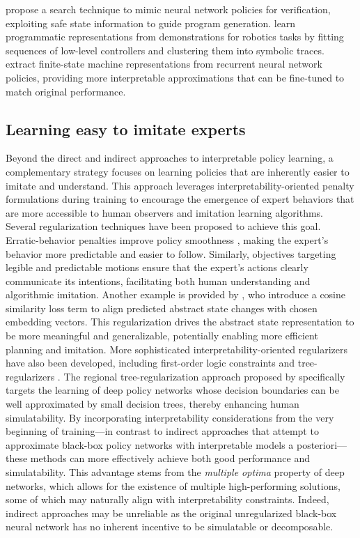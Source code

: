 \cite{zhu_inductive_2019} propose a search technique to mimic neural network policies for verification, exploiting safe state information to guide program generation. \cite{burke_explanation_2019} learn programmatic representations from demonstrations for robotics tasks by fitting sequences of low-level controllers and clustering them into symbolic traces. \cite{Koul_learning_2019} extract finite-state machine representations from recurrent neural network policies, providing more interpretable approximations that can be fine-tuned to match original performance.

\subsection{Learning easy to imitate experts}
Beyond the direct and indirect approaches to interpretable policy learning, a complementary strategy focuses on learning policies that are inherently easier to imitate and understand. This approach leverages interpretability-oriented penalty formulations during training to encourage the emergence of expert behaviors that are more accessible to human observers and imitation learning algorithms.
Several regularization techniques have been proposed to achieve this goal. Erratic-behavior penalties improve policy smoothness \cite{jia_advanced_2019}, making the expert's behavior more predictable and easier to follow. Similarly, objectives targeting legible and predictable motions \cite{dragan_legibility_2013} ensure that the expert's actions clearly communicate its intentions, facilitating both human understanding and algorithmic imitation. Another example is provided by \cite{francois-lavet_combined_2019}, who introduce a cosine similarity loss term to align predicted abstract state changes with chosen embedding vectors. This regularization drives the abstract state representation to be more meaningful and generalizable, potentially enabling more efficient planning and imitation.
More sophisticated interpretability-oriented regularizers have also been developed, including first-order logic constraints \cite{serafini_logic_2016} and tree-regularizers \cite{wu_optimizing_2019}. The regional tree-regularization approach proposed by \cite{wu_optimizing_2019} specifically targets the learning of deep policy networks whose decision boundaries can be well approximated by small decision trees, thereby enhancing human simulatability. By incorporating interpretability considerations from the very beginning of training---in contrast to indirect approaches that attempt to approximate black-box policy networks with interpretable models a posteriori---these methods can more effectively achieve both good performance and simulatability. This advantage stems from the \textit{multiple optima} property of deep networks, which allows for the existence of multiple high-performing solutions, some of which may naturally align with interpretability constraints. Indeed, indirect approaches may be unreliable as the original unregularized black-box neural network has no inherent incentive to be simulatable or decomposable.
